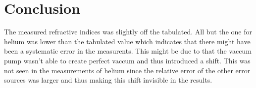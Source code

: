\section{Conclusion}


The measured refractive indices was slightly off the tabulated. All but the one for helium was lower than the tabulated value which indicates that there might have been a systematic error in the measurents. This might be due to that the vaccum pump wasn't able to create perfect vaccum and thus introduced a shift. This was not seen in the measurements of helium since the relative error of the other error sources was larger and thus making this shift invisible in the results.
